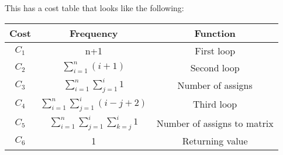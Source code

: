 \documentclass[nobib]{tufte-handout}
\begin{document}
This has a cost table that looks like the following:
\begin{table}
    \centering
    \begin{tabular}{c|c|c}
        Cost  & Frequency                                        & Function                     \\
        \hline
        $C_1$ & n+1                                              & First loop         \\
        $C_2$ & $\sum_{i=1}^{n} (i+1)$                           & Second loop \\
        $C_3$ & $\sum_{i=1}^{n} \sum_{j=1}^{i} 1 $               & Number of assigns \\
        $C_4$ & $\sum_{i=1}^{n} \sum_{j=1}^{i} (i-j+2) $         & Third loop \\
        $C_5$ & $\sum_{i=1}^{n} \sum_{j=1}^{i} \sum_{k=j}^{i} 1$ & Number of assigns to matrix         \\
        $C_6$ & 1                                                & Returning value              \\
    \end{tabular}
\end{table}
\end{document}
